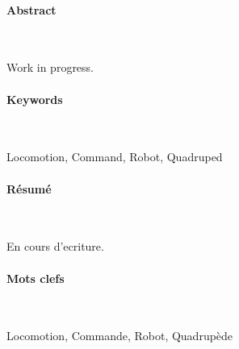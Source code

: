 \newpage

\noindent\makebox[\linewidth]{\rule{0.6\textwidth}{2pt}}

\small

\paragraph{Abstract}~

Work in progress.


\paragraph{Keywords}~

Locomotion, Command, Robot, Quadruped

\noindent\makebox[\linewidth]{\rule{0.6\textwidth}{2pt}}



\newpage


\noindent\makebox[\linewidth]{\rule{0.6\textwidth}{2pt}}


\paragraph{Résumé}~

En cours d'ecriture.


\paragraph{Mots clefs} ~

Locomotion, Commande, Robot, Quadrupède


\noindent\makebox[\linewidth]{\rule{0.6\textwidth}{2pt}}

\normalsize